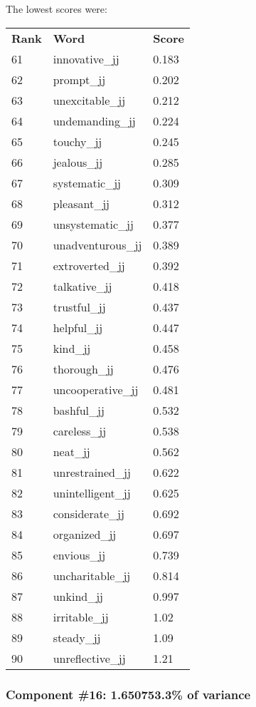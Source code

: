 \documentclass[10pt,letterpaper]{book}
\begin{document}
The lowest scores were:
\begin{tabular}{ l l l }
        \textbf{Rank} & \textbf{Word} & \textbf{Score} \\
        61 & innovative\_jj & 0.183 \\
        62 & prompt\_jj & 0.202 \\
        63 & unexcitable\_jj & 0.212 \\
        64 & undemanding\_jj & 0.224 \\
        65 & touchy\_jj & 0.245 \\
        66 & jealous\_jj & 0.285 \\
        67 & systematic\_jj & 0.309 \\
        68 & pleasant\_jj & 0.312 \\
        69 & unsystematic\_jj & 0.377 \\
        70 & unadventurous\_jj & 0.389 \\
        71 & extroverted\_jj & 0.392 \\
        72 & talkative\_jj & 0.418 \\
        73 & trustful\_jj & 0.437 \\
        74 & helpful\_jj & 0.447 \\
        75 & kind\_jj & 0.458 \\
        76 & thorough\_jj & 0.476 \\
        77 & uncooperative\_jj & 0.481 \\
        78 & bashful\_jj & 0.532 \\
        79 & careless\_jj & 0.538 \\
        80 & neat\_jj & 0.562 \\
        81 & unrestrained\_jj & 0.622 \\
        82 & unintelligent\_jj & 0.625 \\
        83 & considerate\_jj & 0.692 \\
        84 & organized\_jj & 0.697 \\
        85 & envious\_jj & 0.739 \\
        86 & uncharitable\_jj & 0.814 \\
        87 & unkind\_jj & 0.997 \\
        88 & irritable\_jj & 1.02 \\
        89 & steady\_jj & 1.09 \\
        90 & unreflective\_jj & 1.21 \\
\end{tabular}
\subsubsection{Component \#16: 1.650753.3\% of variance}
\end{document}
